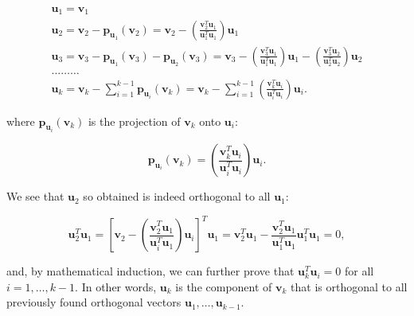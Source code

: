 \documentclass[10pt,b5paper,titlepage]{book}
\begin{document}
\begin{equation}
    \begin{array}{l}
        \mathbf{u}_{1} = \mathbf{v}_{1}\\
        \mathbf{u}_{2} = \mathbf{v}_{2} - \mathbf{p}_{\mathbf{u}_{1}}(\mathbf{v}_{2})
        = \mathbf{v}_{2} - \left( \frac{\mathbf{v}_{2}^{T}\mathbf{u}_{1}}{\mathbf{u}_{1}^{T}\mathbf{u}_{1}} \right) \mathbf{u}_{1}\\
        \mathbf{u}_{3} = \mathbf{v}_{3}
        - \mathbf{p}_{\mathbf{u}_{1}}(\mathbf{v}_{3})
        - \mathbf{p}_{\mathbf{u}_{2}}(\mathbf{v}_{3})
        = \mathbf{v}_{3}
        - \left( \frac{\mathbf{v}_{3}^{T}\mathbf{u}_{1}}{\mathbf{u}_{1}^{T}\mathbf{u}_{1}} \right) \mathbf{u}_{1}
        - \left( \frac{\mathbf{v}_{3}^{T}\mathbf{u}_{2}}{\mathbf{u}_{2}^{T}\mathbf{u}_{2}} \right) \mathbf{u}_{2}\\
        \ldots \ldots \ldots\\
        \mathbf{u}_{k}
        = \mathbf{v}_{k}
        - \sum_{i=1}^{k-1} \mathbf{p}_{\mathbf{u}_{i}}(\mathbf{v}_{k})
        = \mathbf{v}_{k}
        - \sum_{i=1}^{k-1} \left( \frac{\mathbf{v}_{k}^{T}\mathbf{u}_{i}}{\mathbf{u}_{i}^{T}\mathbf{u}_{i}} \right) \mathbf{u}_{i}.
    \end{array}
\end{equation}

where $\mathbf{p}_{\mathbf{u}_{i}}(\mathbf{v}_{k})$ is the projection of
$\mathbf{v}_{k}$ onto $\mathbf{u}_{i}$:

\begin{equation}
    \mathbf{p}_{\mathbf{u}_{i}}(\mathbf{v}_{k})
    = \left( \frac{\mathbf{v}_{k}^{T}\mathbf{u}_{i}}{\mathbf{u}_{i}^{T}\mathbf{u}_{i}} \right) \mathbf{u}_{i}
.\end{equation}

We see that $\mathbf{u}_{2}$ so obtained is indeed orthogonal to all
$\mathbf{u}_{1}$:

\begin{equation}
    \mathbf{u}_{2}^{T}\mathbf{u}_{1}
    = \left[ \mathbf{v}_{2}
        - \left( \frac{\mathbf{v}_{2}^{T}\mathbf{u}_{1}}
        {\mathbf{u}_{i}^{T}\mathbf{u}_{1}} \right)
        \mathbf{u}_{i} \right]^{T} \mathbf{u}_{1}
    = \mathbf{v}_{2}^{T}\mathbf{u}_{1}
    - \frac{\mathbf{v}_{2}^{T}\mathbf{u}_{1}}{\mathbf{u}_{1}^{T}\mathbf{u}_{1}}
    \mathbf{u}_{1}^{T}\mathbf{u}_{1} = 0
,\end{equation}

and, by mathematical induction, we can further prove that $\mathbf{u}_{k}^{T}\mathbf{u}_{i} = 0$
for all $i = 1, \ldots, k-1$. In other words, $\mathbf{u}_{k}$ is the component
of $\mathbf{v}_{k}$ that is orthogonal to all previously found orthogonal vectors
$\mathbf{u}_{1}, \ldots, \mathbf{u}_{k-1}$.
\end{document}
